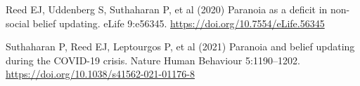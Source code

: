 \documentclass[
  11pt,
]{article}
\newlength{\cslhangindent}
\newenvironment{CSLReferences}[2] %
 {\begin{list}{}{%
  \setlength{\itemindent}{0pt}
  \setlength{\leftmargin}{0pt}
  \setlength{\parsep}{0pt}
  \ifodd #1
   \setlength{\leftmargin}{\cslhangindent}
   \setlength{\itemindent}{-1\cslhangindent}
  \fi
  \setlength{\itemsep}{#2\baselineskip}}}
 {\end{list}}
\begin{document}
\protect{}\label{refs}
\begin{CSLReferences}{1}{1}
Reed EJ, Uddenberg S, Suthaharan P, et al (2020) Paranoia as a deficit
in non-social belief updating. eLife 9:e56345.
\url{https://doi.org/10.7554/eLife.56345}

Suthaharan P, Reed EJ, Leptourgos P, et al (2021) Paranoia and belief
updating during the {COVID-19} crisis. Nature Human Behaviour
5:1190--1202. \url{https://doi.org/10.1038/s41562-021-01176-8}

\end{CSLReferences}
\end{document}
